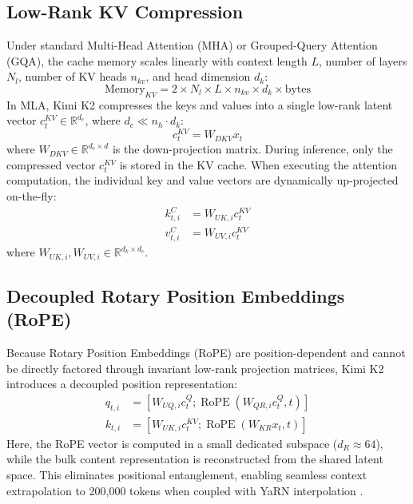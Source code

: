 \documentclass[conference]{IEEEtran}
\begin{document}
\subsection{Low-Rank KV Compression}
Under standard Multi-Head Attention (MHA) or Grouped-Query Attention (GQA), the cache memory scales linearly with context length $L$, number of layers $N_l$, number of KV heads $n_{kv}$, and head dimension $d_k$:
\begin{equation}
\text{Memory}_{KV} = 2 \times N_l \times L \times n_{kv} \times d_k \times \text{bytes}
\end{equation}
In MLA, Kimi K2 compresses the keys and values into a single low-rank latent vector $c_t^{KV} \in \mathbb{R}^{d_c}$, where $d_c \ll n_h \cdot d_k$:
\begin{equation}
c_t^{KV} = W_{DKV} x_t
\end{equation}
where $W_{DKV} \in \mathbb{R}^{d_c \times d}$ is the down-projection matrix. During inference, only the compressed vector $c_t^{KV}$ is stored in the KV cache. When executing the attention computation, the individual key and value vectors are dynamically up-projected on-the-fly:
\begin{align}
k_{t,i}^C &= W_{UK,i} c_t^{KV} \\
v_{t,i}^C &= W_{UV,i} c_t^{KV}
\end{align}
where $W_{UK,i}, W_{UV,i} \in \mathbb{R}^{d_k \times d_c}$.

\subsection{Decoupled Rotary Position Embeddings (RoPE)}
Because Rotary Position Embeddings (RoPE) \cite{su2024roformer} are position-dependent and cannot be directly factored through invariant low-rank projection matrices, Kimi K2 introduces a decoupled position representation:
\begin{align}
q_{t,i} &= \left[ W_{UQ,i} c_t^Q ; \operatorname{RoPE}(W_{QR,i} c_t^Q, t) \right] \\
k_{t,i} &= \left[ W_{UK,i} c_t^{KV} ; \operatorname{RoPE}(W_{KR} x_t, t) \right]
\end{align}
Here, the RoPE vector is computed in a small dedicated subspace ($d_R \approx 64$), while the bulk content representation is reconstructed from the shared latent space. This eliminates positional entanglement, enabling seamless context extrapolation to 200,000 tokens when coupled with YaRN interpolation \cite{peng2023yarn}.
\end{document}
